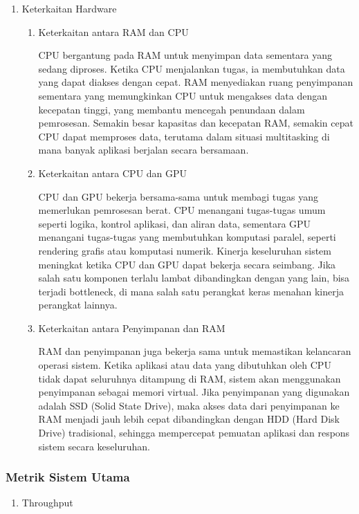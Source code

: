 \documentclass[12pt]{article}
\begin{document}
\begin{enumerate}
\begin{enumerate}
    \end{enumerate}
    \item {Keterkaitan Hardware}
    \par \begin{enumerate}
        \item {{Keterkaitan antara RAM dan CPU}}
        \par CPU bergantung pada RAM untuk menyimpan data sementara yang sedang diproses. Ketika CPU menjalankan tugas, ia membutuhkan data yang dapat diakses dengan cepat. RAM menyediakan ruang penyimpanan sementara yang memungkinkan CPU untuk mengakses data dengan kecepatan tinggi, yang membantu mencegah penundaan dalam pemrosesan. Semakin besar kapasitas dan kecepatan RAM, semakin cepat CPU dapat memproses data, terutama dalam situasi multitasking di mana banyak aplikasi berjalan secara bersamaan.
    
        \item {{Keterkaitan antara CPU dan GPU}}
        \par CPU dan GPU bekerja bersama-sama untuk membagi tugas yang memerlukan pemrosesan berat. CPU menangani tugas-tugas umum seperti logika, kontrol aplikasi, dan aliran data, sementara GPU menangani tugas-tugas yang membutuhkan komputasi paralel, seperti rendering grafis atau komputasi numerik. Kinerja keseluruhan sistem meningkat ketika CPU dan GPU dapat bekerja secara seimbang. Jika salah satu komponen terlalu lambat dibandingkan dengan yang lain, bisa terjadi bottleneck, di mana salah satu perangkat keras menahan kinerja perangkat lainnya.
    
        \item {{Keterkaitan antara Penyimpanan dan RAM}}
        \par RAM dan penyimpanan juga bekerja sama untuk memastikan kelancaran operasi sistem. Ketika aplikasi atau data yang dibutuhkan oleh CPU tidak dapat seluruhnya ditampung di RAM, sistem akan menggunakan penyimpanan sebagai memori virtual. Jika penyimpanan yang digunakan adalah SSD (Solid State Drive), maka akses data dari penyimpanan ke RAM menjadi jauh lebih cepat dibandingkan dengan HDD (Hard Disk Drive) tradisional, sehingga mempercepat pemuatan aplikasi dan respons sistem secara keseluruhan.
    
    \end{enumerate} 

\end{enumerate}
    


\subsubsection{Metrik Sistem Utama}
\begin{enumerate}
    \item Throughput
\end{enumerate}
\end{document}
